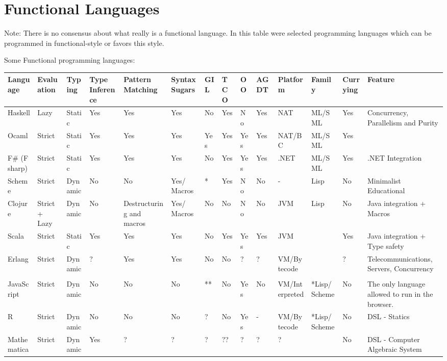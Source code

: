 \documentclass[11pt]{article}
\begin{document}
\section{Functional Languages}
\label{sec-2}

Note: There is no consensus about what really is a functional
language. In this table were selected programming languages which can
be programmed in functional-style or favors this style. 

Some Functional programming languages:

\begin{center}
\begin{tabular}{llllllllllllll}
Language & Evaluation & Typing & Type Inference & Pattern Matching & Syntax Sugars & GIL & TCO & OO & AGDT & Platform & Family & Currying & Feature\\
\hline
Haskell & Lazy & Static & Yes & Yes & Yes & No & Yes & No & Yes & NAT & ML/SML & Yes & Concurrency, Parallelism and Purity\\
Ocaml & Strict & Static & Yes & Yes & Yes & Yes & Yes & Yes & Yes & NAT/BC & ML/SML & Yes & \\
F\# (F sharp) & Strict & Static & Yes & Yes & Yes & No & Yes & Yes & Yes & .NET & ML/SML & Yes & .NET Integration\\
Scheme & Strict & Dynamic & No & No & Yes/ Macros & * & Yes & No & No & - & Lisp & No & Minimalist Educational\\
Clojure & Strict + Lazy & Dynamic & No & Destructuring and macros & Yes/ Macros & No & No & No & No & JVM & Lisp & No & Java integration + Macros\\
Scala & Strict & Static & Yes & Yes & Yes & No & Yes & Yes & Yes & JVM &  & Yes & Java integration + Type safety\\
Erlang & Strict & Dynamic & ? & Yes & Yes & No & No & ? & ? & VM/Bytecode &  & ? & Telecommunications, Servers, Concurrency\\
 &  &  &  &  &  &  &  &  &  &  &  &  & \\
JavaScript & Strict & Dynamic & No & No & No & ** & No & Yes & No & VM/Interpreted & *Lisp/ Scheme & No & The only language allowed to run in the browser.\\
R & Strict & Dynamic & No & No & No & ? & No & Yes & - & VM/Bytecode & *Lisp/ Scheme & No & DSL - Statics\\
Mathematica & Strict & Dynamic & Yes & ? & ? & ? & ?? & ? & ? & ? &  & No & DSL - Computer Algebraic System\\
\end{tabular}
\end{center}
\end{document}
